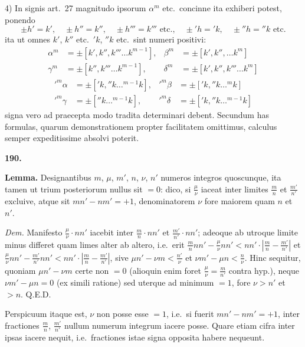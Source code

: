 \documentclass[12pt,a4paper]{article}
\theoremstyle{plain}
\begin{document}
4) In signis art.~27 magnitudo ipsorum $\alpha^m$ etc.~concinne ita exhiberi potest, ponendo
\[
\pm h' = k', \quad \pm h'' = k'', \quad \pm h''' = k''' \text{ etc.}, \quad \pm 'h = 'k, \quad \pm ''h = ''k \text{ etc.}
\]
ita ut omnes $k'$, $k''$ etc.~$'k$, $''k$ etc.~sint numeri positivi:
\[
\begin{aligned}
\alpha^m &= \pm [k', k'', k''' \ldots k^{m-1}], & \beta^m &= \pm [k', k'', \ldots k^m]\\
\gamma^m &= \pm [k'', k''' \ldots k^{m-1}], & \delta^m &= \pm [k', k'', k''' \ldots k^m]
\end{aligned}
\]
\[
\begin{aligned}
'^m\alpha &= \pm ['k, ''k \ldots {}^{m-1}k], & '^m\beta &= \pm ['k, ''k \ldots {}^mk]\\
'^m\gamma &= \pm [''k \ldots {}^{m-1}k], & '^m\delta &= \pm ['k, ''k \ldots {}^{m-1}k]
\end{aligned}
\]
signa vero ad praecepta modo tradita determinari debent. Secundum has formulas, quarum demonstrationem propter facilitatem omittimus, calculus semper expeditissime absolvi poterit.

\bigskip

\textbf{190.}

\textbf{Lemma.} Designantibus $m$, $\mu$, $m'$, $n$, $\nu$, $n'$ numeros integros quoscunque, ita tamen ut trium posteriorum nullus sit $= 0$: dico, si $\frac{\mu}{\nu}$ iaceat inter limites $\frac{m}{n}$ et $\frac{m'}{n'}$ excluive, atque sit $mn' - nm' = +1$, denominatorem $\nu$ fore maiorem quam $n$ et $n'$.

\textit{Dem.} Manifesto $\frac{\mu}{\nu} \cdot n n'$ iacebit inter $\frac{m}{n} \cdot n n'$ et $\frac{m'}{n'} \cdot n n'$; adeoque ab utroque limite minus differet quam limes alter ab altero, i.e.~erit $\frac{m}{n} n n' - \frac{\mu}{\nu} n n' < n n' \cdot |\frac{m}{n} - \frac{m'}{n'}|$ et $\frac{\mu}{\nu} n n' - \frac{m'}{n'} n n' < n n' \cdot |\frac{m}{n} - \frac{m'}{n'}|$, sive $\mu n' - \nu m < \frac{n'}{\nu}$ et $\nu m' - \mu n < \frac{n}{\nu}$. Hinc sequitur, quoniam $\mu n' - \nu m$ certe non $= 0$ (alioquin enim foret $\frac{\mu}{\nu} = \frac{m}{n'}$ contra hyp.), neque $\nu m' - \mu n = 0$ (ex simili ratione) sed uterque ad minimum $= 1$, fore $\nu > n'$ et $> n$. \hfill Q.E.D.

Perspicuum itaque est, $\nu$ non posse esse $= 1$, i.e.~si fuerit $mn' - nm' = +1$, inter fractiones $\frac{m}{n}$, $\frac{m'}{n'}$ nullum numerum integrum iacere posse. Quare etiam cifra inter ipsas iacere nequit, i.e.~fractiones istae signa opposita habere nequeunt.
\end{document}
